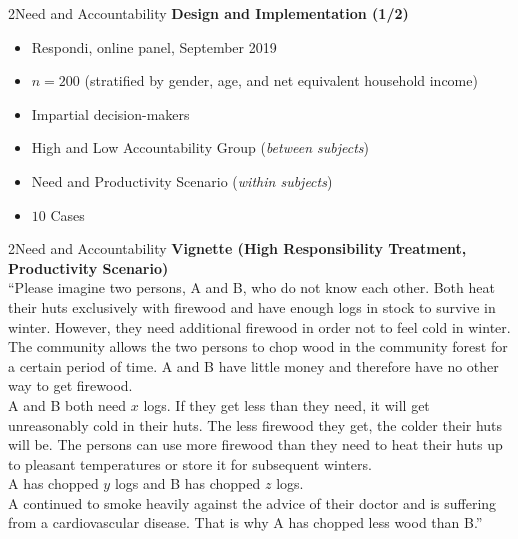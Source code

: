 \documentclass[xcolor=table,9pt,aspectratio=169]{beamer}
\begin{document}
\begin{frame}{\vspace*{10mm}2\hspace*{1em}Need and Accountability}
\textbf{Design and Implementation (1/2)}\\
\medskip
\begin{itemize}
   \item Respondi, online panel, September 2019
   \item $n=200$ (stratified by gender, age, and net equivalent household income)
   \item Impartial decision-makers
   \item High and Low Accountability Group (\textit{between subjects})
   \item Need and Productivity Scenario (\textit{within subjects})
   \item $10$ Cases
\end{itemize}
\end{frame}


\begin{frame}{\vspace*{10mm}2\hspace*{1em}Need and Accountability}
\textbf{Vignette (High Responsibility Treatment, Productivity Scenario)}\\
\medskip
\enquote{Please imagine two persons, A and B, who do not know each other.
Both heat their huts exclusively with firewood and have enough logs in stock to survive in winter.
However, they need additional firewood in order not to feel cold in winter.
The community allows the two persons to chop wood in the community forest for a certain period of time.
A and B have little money and therefore have no other way to get firewood.\\
\medskip
A and B both need $x$ logs.
If they get less than they need, it will get unreasonably cold in their huts.
The less firewood they get, the colder their huts will be.
The persons can use more firewood than they need to heat their huts up to pleasant temperatures or store it for subsequent winters.\\
\medskip
A has chopped $y$ logs and B has chopped $z$ logs.\\
\medskip
A continued to smoke heavily against the advice of their doctor and is suffering from a cardiovascular disease.
That is why A has chopped less wood than B.}
\end{frame}
\end{document}
